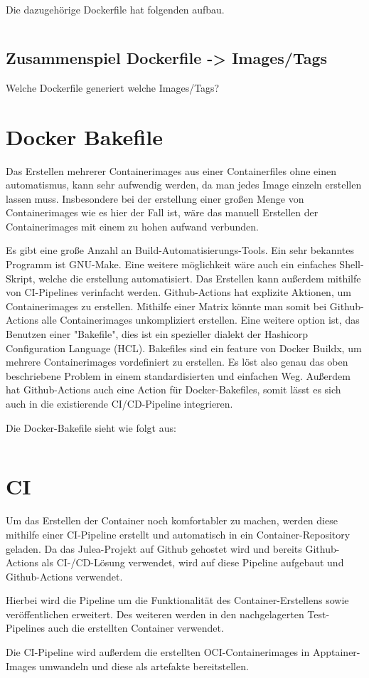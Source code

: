 Die dazugehörige Dockerfile hat folgenden aufbau.

\inputminted{dockerfile}{./code-examples/Dockerfile.spack}

\subsection{Zusammenspiel Dockerfile -> Images/Tags}

Welche Dockerfile generiert welche Images/Tags?

\section{Docker Bakefile}

Das Erstellen mehrerer Containerimages aus einer Containerfiles ohne einen automatismus, kann sehr aufwendig werden, da man jedes Image einzeln erstellen lassen muss. Insbesondere bei der erstellung einer großen Menge von Containerimages wie es hier der Fall ist, wäre das manuell Erstellen der Containerimages mit einem zu hohen aufwand verbunden. 

Es gibt eine große Anzahl an Build-Automatisierungs-Tools. Ein sehr bekanntes Programm ist GNU-Make. Eine weitere möglichkeit wäre auch ein einfaches Shell-Skript, welche die erstellung automatisiert. Das Erstellen kann außerdem mithilfe von CI-Pipelines verinfacht werden. Github-Actions hat explizite Aktionen, um Containerimages zu erstellen. Mithilfe einer Matrix könnte man somit bei Github-Actions alle Containerimages unkompliziert erstellen. Eine weitere option ist, das Benutzen einer "Bakefile", dies ist ein spezieller dialekt der Hashicorp Configuration Language (HCL). Bakefiles sind ein feature von Docker Buildx, um mehrere Containerimages vordefiniert zu erstellen. Es löst also genau das oben beschriebene Problem in einem standardisierten und einfachen Weg. Außerdem hat Github-Actions auch eine Action für Docker-Bakefiles, somit lässt es sich auch in die existierende CI/CD-Pipeline integrieren. 

Die Docker-Bakefile sieht wie folgt aus: 

\inputminted{dockerfile}{./code-examples/docker-bake.hcl}

\section{CI}

Um das Erstellen der Container noch komfortabler zu machen, werden diese mithilfe einer CI-Pipeline erstellt und automatisch in ein Container-Repository geladen. Da das Julea-Projekt auf Github gehostet wird und bereits Github-Actions als CI-/CD-Lösung verwendet, wird auf diese Pipeline aufgebaut und Github-Actions verwendet.

Hierbei wird die Pipeline um die Funktionalität des Container-Erstellens sowie veröffentlichen erweitert. Des weiteren werden in den nachgelagerten Test-Pipelines auch die erstellten Container verwendet.

Die CI-Pipeline wird außerdem die erstellten OCI-Containerimages in Apptainer-Images umwandeln und diese als artefakte bereitstellen.



